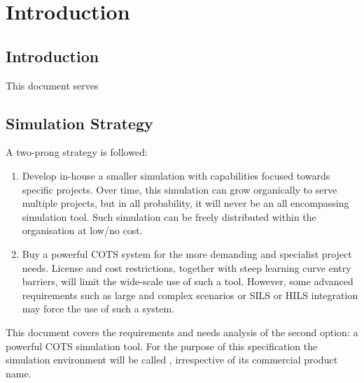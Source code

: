 
\chapter{Introduction}
\label{chap:Introduction}


\section{Introduction}

This document serves 




\section{Simulation Strategy}

A two-prong strategy is followed:
\begin{enumerate}
    \item Develop in-house a smaller simulation with capabilities focused towards specific projects. Over time, this simulation can grow organically to serve multiple projects, but in all probability, it will never be an all encompassing simulation tool.  Such  simulation can be freely distributed within the organisation at low/no cost.
    \item Buy a powerful \ac{COTS} system for the more demanding and specialist project needs.  License and  cost restrictions, together with steep learning curve entry barriers,  will limit the wide-scale use of such a tool.  However, some advanced requirements such as large and complex scenarios or \ac{SILS} or \ac{HILS} integration may force the use of such a system.
\end{enumerate}

This document covers the requirements and needs analysis of the second option: a powerful \ac{COTS} simulation tool.
For the purpose of this specification the simulation environment will be called \scesys, irrespective of its commercial product name.


